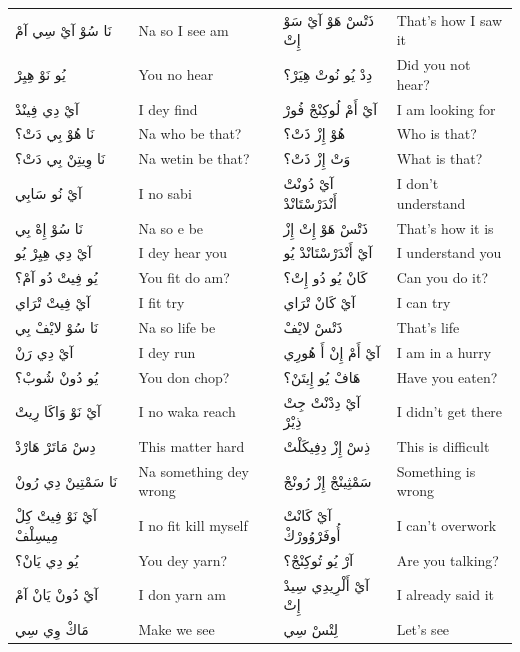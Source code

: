 \documentclass[12pt]{article}
\newcommand{\AR}[1]{\foreignlanguage{arabic}{#1}}
\begin{document}
\begin{longtable}{p{3.2cm} p{3.2cm} p{3.2cm} p{3.2cm}}
\AR{نَا} \AR{سُوْ} \AR{آيْ} \AR{سِي} \AR{آمْ} & Na so I see am & \AR{ذَتْسْ} \AR{هَوْ} \AR{آيْ} \AR{سَوْ} \AR{إِتْ} & That’s how I saw it \\
\AR{يُو} \AR{نَوْ} \AR{هِيِرْ} & You no hear & \AR{دِدْ} \AR{يُو} \AR{نُوتْ} \AR{هِيَرْ؟} & Did you not hear? \\
\AR{آيْ} \AR{دِي} \AR{فِينْدْ} & I dey find & \AR{آيْ} \AR{أَمْ} \AR{لُوكِنْجْ} \AR{فُورْ} & I am looking for \\
\AR{نَا} \AR{هُوْ} \AR{بِي} \AR{دَتْ؟} & Na who be that? & \AR{هُوْ} \AR{إِزْ} \AR{ذَتْ؟} & Who is that? \\
\AR{نَا} \AR{وِيتِنْ} \AR{بِي} \AR{دَتْ؟} & Na wetin be that? & \AR{وَتْ} \AR{إِزْ} \AR{ذَتْ؟} & What is that? \\
\AR{آيْ} \AR{نُو} \AR{سَابِي} & I no sabi & \AR{آيْ} \AR{دُونْتْ} \AR{أَنْدَرْسْتَانْدْ} & I don’t understand \\
\AR{نَا} \AR{سُوْ} \AR{إِهْ} \AR{بِي} & Na so e be & \AR{ذَتْسْ} \AR{هَوْ} \AR{إِتْ} \AR{إِزْ} & That’s how it is \\
\AR{آيْ} \AR{دِي} \AR{هِيِرْ} \AR{يُو} & I dey hear you & \AR{آيْ} \AR{أَنْدَرْسْتَانْدْ} \AR{يُو} & I understand you \\
\AR{يُو} \AR{فِيتْ} \AR{دُو} \AR{آمْ؟} & You fit do am? & \AR{كَانْ} \AR{يُو} \AR{دُو} \AR{إِتْ؟} & Can you do it? \\
\AR{آيْ} \AR{فِيتْ} \AR{تْرَاي} & I fit try & \AR{آيْ} \AR{كَانْ} \AR{تْرَاي} & I can try \\
\AR{نَا} \AR{سُوْ} \AR{لايْفْ} \AR{بِي} & Na so life be & \AR{ذَتْسْ} \AR{لايْفْ} & That’s life \\
\AR{آيْ} \AR{دِي} \AR{رَنْ} & I dey run & \AR{آيْ} \AR{أَمْ} \AR{إِنْ} \AR{أَ} \AR{هُورِي} & I am in a hurry \\
\AR{يُو} \AR{دُونْ} \AR{شُوبْ؟} & You don chop? & \AR{هَافْ} \AR{يُو} \AR{إِيتَنْ؟} & Have you eaten? \\
\AR{آيْ} \AR{نَوْ} \AR{وَاكَا} \AR{رِيتْ} & I no waka reach & \AR{آيْ} \AR{دِدْنْتْ} \AR{جِتْ} \AR{ذِيْرْ} & I didn’t get there \\
\AR{دِسْ} \AR{مَاتَرْ} \AR{هَارْدْ} & This matter hard & \AR{ذِسْ} \AR{إِزْ} \AR{دِفِيكَلْتْ} & This is difficult \\
\AR{نَا} \AR{سَمْتِينْ} \AR{دِي} \AR{رُونْ} & Na something dey wrong & \AR{سَمْثِينْجْ} \AR{إِزْ} \AR{رُونْجْ} & Something is wrong \\
\AR{آيْ} \AR{نَوْ} \AR{فِيتْ} \AR{كِلْ} \AR{مِيسِلْفْ} & I no fit kill myself & \AR{آيْ} \AR{كَانْتْ} \AR{أُوفَرْوُورْكْ} & I can’t overwork \\
\AR{يُو} \AR{دِي} \AR{يَانْ؟} & You dey yarn? & \AR{آرْ} \AR{يُو} \AR{تُوكِنْجْ؟} & Are you talking? \\
\AR{آيْ} \AR{دُونْ} \AR{يَانْ} \AR{آمْ} & I don yarn am & \AR{آيْ} \AR{أَلْرِيدِي} \AR{سِيدْ} \AR{إِتْ} & I already said it \\
\AR{مَاكْ} \AR{وِي} \AR{سِي} & Make we see & \AR{لِتْسْ} \AR{سِي} & Let’s see \\


\end{longtable}
\end{document}
